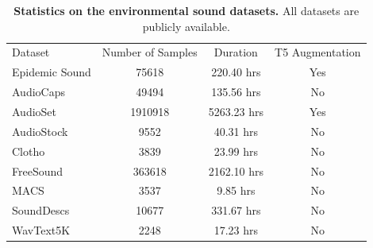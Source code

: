 

\begin{table}[h]
\centering
{}
\begin{tabular}{l|ccc}
  Dataset
  & Number of Samples
  & Duration
  & T5 Augmentation
  \\
  \shline
  Epidemic Sound & 75618 & 220.40 hrs & Yes
  \\ 
  AudioCaps~\cite{audiocaps} & 49494 & 135.56 hrs & No
  \\
  AudioSet~\cite{audioset} & 1910918 & 5263.23 hrs & Yes
  \\
  AudioStock & 9552 & 40.31 hrs & No
  \\
  Clotho~\cite{clotho} & 3839 & 23.99 hrs & No
  \\ 
  FreeSound~\cite{freesound} & 363618 & 2162.10 hrs & No
  \\
  MACS & 3537 & 9.85 hrs & No
  \\ 
  SoundDescs~\cite{sounddescs} & 10677 & 331.67 hrs & No
  \\
  WavText5K~\cite{wavtext5k} & 2248 & 17.23 hrs & No
  \\
\end{tabular}
\caption{\textbf{Statistics on the environmental sound datasets.} All datasets are publicly available.}
\label{tb:audio_dataset}
\end{table}